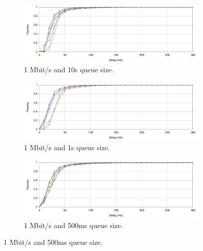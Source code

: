 \begin{figure}[htp]
        \centering
        \begin{subfigure}[h]{1\textwidth}
                \centering
                \includegraphics[width=\textwidth]{./figures/1mb_10s_total_delay_distribution.pdf}
      \caption[1 Mbit/s and 10s queue size]{1 Mbit/s and 10s queue size.}
	\label{fig:1mb_10s_total_delay_distribution}
        \end{subfigure}
        
        \begin{subfigure}[h]{1\textwidth}
                \centering
                \includegraphics[width=\textwidth]{./figures/1mb_1s_total_delay_distribution.pdf}
      \caption[1 Mbit/s and 1s queue size]{1 Mbit/s and 1s queue size.}
	\label{fig:1mb_1s_total_delay_distribution}
        \end{subfigure}

        \begin{subfigure}[h]{1\textwidth}
                \centering
                \includegraphics[width=\textwidth]{./figures/1mb_05s_total_delay_distribution.pdf}
      \caption[1 Mbit/s and 500ms queue size]{1 Mbit/s and 500ms queue size.}
	\label{fig:1mb_05s_total_delay_distribution}
        \end{subfigure}%
        

\end{figure}
